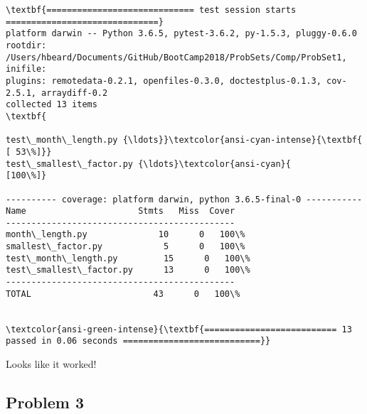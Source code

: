 \documentclass[11pt]{article}
\begin{document}
    \begin{Verbatim}[commandchars=\\\{\}]
\textbf{============================= test session starts ==============================}
platform darwin -- Python 3.6.5, pytest-3.6.2, py-1.5.3, pluggy-0.6.0
rootdir: /Users/hbeard/Documents/GitHub/BootCamp2018/ProbSets/Comp/ProbSet1, inifile:
plugins: remotedata-0.2.1, openfiles-0.3.0, doctestplus-0.1.3, cov-2.5.1, arraydiff-0.2
collected 13 items                                                             \textbf{

test\_month\_length.py {\ldots}}\textcolor{ansi-cyan-intense}{\textbf{                                             [ 53\%]}}
test\_smallest\_factor.py {\ldots}\textcolor{ansi-cyan}{                                           [100\%]}

---------- coverage: platform darwin, python 3.6.5-final-0 -----------
Name                      Stmts   Miss  Cover
---------------------------------------------
month\_length.py              10      0   100\%
smallest\_factor.py            5      0   100\%
test\_month\_length.py         15      0   100\%
test\_smallest\_factor.py      13      0   100\%
---------------------------------------------
TOTAL                        43      0   100\%


\textcolor{ansi-green-intense}{\textbf{========================== 13 passed in 0.06 seconds ===========================}}

    \end{Verbatim}

    Looks like it worked!

    \subsection*{Problem 3}\label{problem-3}
\end{document}
